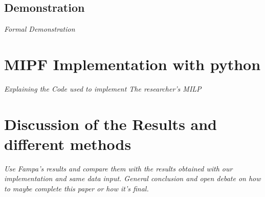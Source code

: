 \documentclass[letterpaper]{article}
\begin{document}
\subsection{Demonstration}
\textit{Formal Demonstration}
\section{MIPF Implementation with python}
\textit{Explaining the Code used to implement The researcher's MILP}
\section{Discussion of the Results and different methods}
\textit{Use Fampa's results and compare them with the results obtained with our implementation and same data input.
General conclusion and open debate on how to maybe complete this paper or how it's final.}
\end{document}

